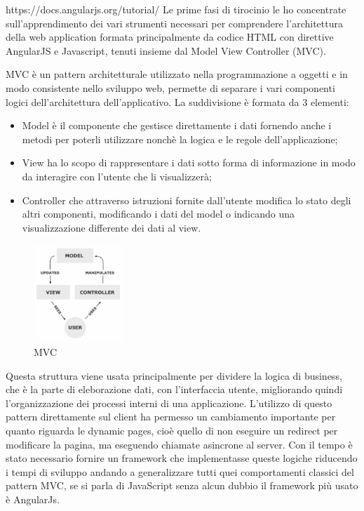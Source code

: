https://docs.angularjs.org/tutorial/
\fi
Le prime fasi di tirocinio le ho concentrate sull'apprendimento dei vari strumenti necessari per comprendere l'architettura della web application formata principalmente da codice HTML con direttive AngularJS e Javascript, tenuti insieme dal Model View Controller (MVC).

MVC è un pattern architetturale utilizzato nella programmazione a oggetti e in modo consistente nello sviluppo web, permette di separare i vari componenti logici dell'architettura dell'applicativo. La suddivisione è formata da 3 elementi:
\begin{itemize}
  \item Model è il componente che gestisce direttamente i dati fornendo anche i metodi per poterli utilizzare nonchè la logica e le regole dell'applicazione;
  \item View ha lo scopo di rappresentare i dati sotto forma di informazione in modo da interagire con l'utente che li visualizzerà;
  \item Controller che attraverso istruzioni fornite dall'utente modifica lo stato degli altri componenti, modificando i dati del model o indicando una visualizzazione differente dei dati al view.
\end{itemize}
\begin{figure}[H]
 \centering
  \includegraphics[width=0.3\textwidth]{img/MVC-Process.png}
 \caption{MVC}
 \end{figure}
Questa struttura viene usata principalmente per dividere la logica di business, che è la parte di eleborazione dati, con l'interfaccia utente, migliorando quindi l'organizzazione dei processi interni di una applicazione.
L'utilizzo di questo pattern direttamente sul client ha permesso un cambiamento importante per quanto riguarda le dynamic pages, cioè quello di non eseguire un redirect per modificare la pagina, ma eseguendo chiamate asincrone al server.
Con il tempo è stato necessario fornire un framework che implementasse queste logiche riducendo i tempi di sviluppo andando a generalizzare tutti quei comportamenti classici del pattern MVC, se si parla di JavaScript senza alcun dubbio il framework più usato è AngularJs.
